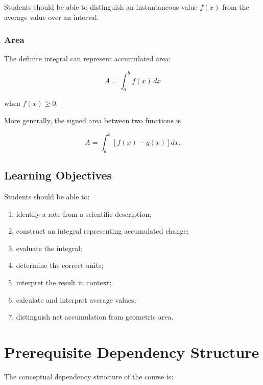 \documentclass[11pt]{article}
\begin{document}
Students should be able to distinguish an instantaneous value $f(x)$ from
the average value over an interval.

\subsubsection{Area}

The definite integral can represent accumulated area:

\[
A
=
\int_a^b f(x)\,dx
\]

when $f(x)\geq 0$.

More generally, the signed area between two functions is

\[
A
=
\int_a^b
\left[f(x)-g(x)\right]dx.
\]

\subsection{Learning Objectives}

Students should be able to:

\begin{enumerate}
    \item identify a rate from a scientific description;
    \item construct an integral representing accumulated change;
    \item evaluate the integral;
    \item determine the correct units;
    \item interpret the result in context;
    \item calculate and interpret average values;
    \item distinguish net accumulation from geometric area.
\end{enumerate}

\section{Prerequisite Dependency Structure}

The conceptual dependency structure of the course is:
\end{document}
